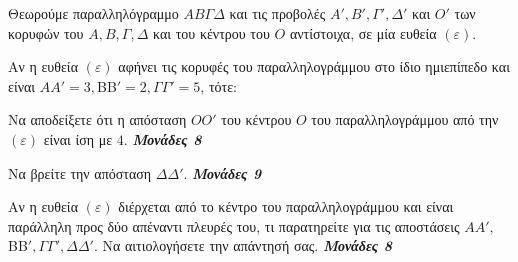 \documentclass[11pt,a4paper,twoside]{book}
\newcommand{\monades}[1]{
\hspace*{\fill}
\textbf{\textit{\textcolor{maincolor}{Μονάδες #1}}}}
\begin{document}
Θεωρούμε παραλληλόγραμμο $ΑΒ\varGamma \varDelta  $ και τις προβολές $Α', B', \varGamma ', \varDelta  '$ και $Ο'$ των κορυφών του $Α, B, \varGamma , \varDelta  $ και του κέντρου του $Ο$ αντίστοιχα, σε μία ευθεία $(\varepsilon)$.

\begin{alist}
\item Αν η ευθεία $(\varepsilon)$ αφήνει τις κορυφές του παραλληλογράμμου στο ίδιο ημιεπίπεδο και είναι $AA'=3, $BB$'=2, \varGamma \varGamma '=5$, τότε:
\begin{alist}
\item Να αποδείξετε ότι η απόσταση $ΟΟ'$ του κέντρου $Ο$ του παραλληλογράμμου από την $(\varepsilon)$ είναι ίση με $4$. \monades{8}
\item Να βρείτε την απόσταση $\Delta\varDelta  '$. \monades{9}
\end{alist}

\begin{center}
\end{center}

\item Αν η ευθεία $(\varepsilon)$ διέρχεται από το κέντρο του παραλληλογράμμου και είναι παράλληλη προς δύο απέναντι πλευρές του, τι παρατηρείτε για τις αποστάσεις $AA', $BB$', \varGamma \varGamma ', \Delta\varDelta  '$.
Να αιτιολογήσετε την απάντησή σας. \monades{8}
\end{alist}
\end{document}
